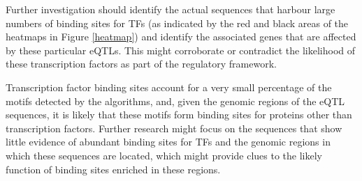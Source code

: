 \documentclass[12pt]{article}
\begin{document}
Further investigation should identify the actual sequences that harbour large numbers of binding sites for TFs (as indicated by the red and black areas of the heatmaps in Figure \ref{heatmap}) and identify the associated genes that are affected by these particular eQTLs. This might corroborate or contradict the likelihood of these transcription factors as part of the regulatory framework.

Transcription factor binding sites account for a very small percentage of the motifs detected by the algorithms, and, given the genomic regions of the eQTL sequences, it is likely that these motifs form binding sites for proteins other than transcription factors. Further research might focus on the sequences that show little evidence of abundant binding sites for TFs and the genomic regions in which these sequences are located, which might provide clues to the likely function of binding sites enriched in these regions. 


\clearpage


\end{document}

